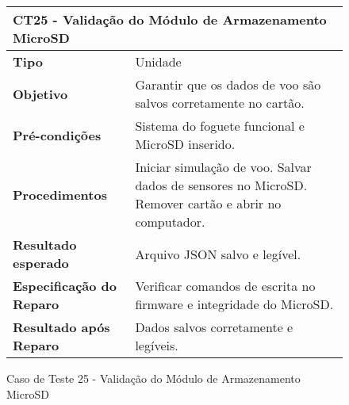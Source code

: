 \begin{figure}[H]
    \centering
\begin{longtable}{|p{}|p{}|}
\hline
\multicolumn{2}{|l|}{\textbf{CT25 - Validação do Módulo de Armazenamento MicroSD}} \\
\hline
\textbf{Tipo} & Unidade \\
\hline
\textbf{Objetivo} & Garantir que os dados de voo são salvos corretamente no cartão. \\
\hline
\textbf{Pré-condições} & Sistema do foguete funcional e MicroSD inserido. \\
\hline
\textbf{Procedimentos} &  Iniciar simulação de voo.  Salvar dados de sensores no MicroSD.  Remover cartão e abrir no computador.  \\
\hline
\textbf{Resultado esperado} & Arquivo JSON salvo e legível. \\
\hline
\textbf{Especificação do Reparo} & Verificar comandos de escrita no firmware e integridade do MicroSD. \\
\hline
\textbf{Resultado após Reparo} & Dados salvos corretamente e legíveis. \\
\hline
\end{longtable}
\caption{Caso de Teste 25 - Validação do Módulo de Armazenamento MicroSD}
\label{fig_ct22_validacao_modulo_armazenamento_microsd}
\end{figure}